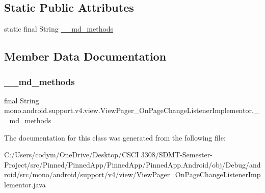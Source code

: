 \subsection*{Static Public Attributes}
\begin{DoxyCompactItemize}
\item 
static final String \hyperlink{classmono_1_1android_1_1support_1_1v4_1_1view_1_1_view_pager___on_page_change_listener_implementor_a5133c757511dd09339d00fbc794ef33a}{\+\_\+\+\_\+md\+\_\+methods}
\end{DoxyCompactItemize}


\subsection{Member Data Documentation}
\mbox{\label{classmono_1_1android_1_1support_1_1v4_1_1view_1_1_view_pager___on_page_change_listener_implementor_a5133c757511dd09339d00fbc794ef33a}} 
\subsubsection{\texorpdfstring{\+\_\+\+\_\+md\+\_\+methods}{\_\_md\_methods}}
{\footnotesize\ttfamily final String mono.\+android.\+support.\+v4.\+view.\+View\+Pager\+\_\+\+On\+Page\+Change\+Listener\+Implementor.\+\_\+\+\_\+md\+\_\+methods\hspace{0.3cm}{\ttfamily [static]}}



The documentation for this class was generated from the following file\+:\begin{DoxyCompactItemize}
\item 
C\+:/\+Users/codym/\+One\+Drive/\+Desktop/\+C\+S\+C\+I 3308/\+S\+D\+M\+T-\/\+Semester-\/\+Project/src/\+Pinned/\+Pinned\+App/\+Pinned\+App/\+Pinned\+App.\+Android/obj/\+Debug/android/src/mono/android/support/v4/view/View\+Pager\+\_\+\+On\+Page\+Change\+Listener\+Implementor.\+java\end{DoxyCompactItemize}
